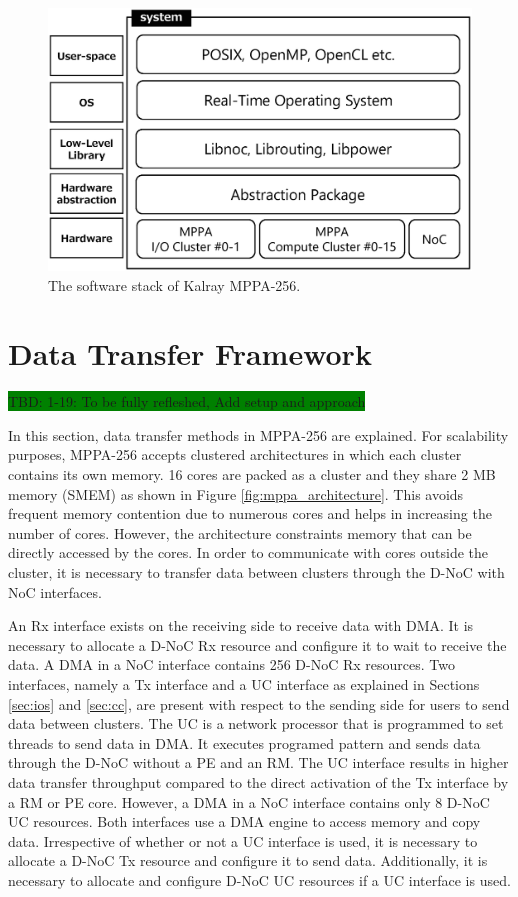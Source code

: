 \documentclass[conference,compsoc]{IEEEtran}
\begin{document}
\begin{figure}[t]
  \centering
  \includegraphics[width=0.8\linewidth]{../figure/softwarestack.eps}
  \caption{\label{fig:software_stack}
    The software stack of Kalray MPPA-256.}
\end{figure}


\section{Data Transfer Framework}
\label{sec:framework}
\colorbox{green}{TBD: 1-19: To be fully refleshed, Add setup and approach}

In this section, data transfer methods in MPPA-256 are explained.
For scalability purposes, MPPA-256 accepts clustered architectures in which each cluster contains its own memory.
16 cores are packed as a cluster and they share 2 MB memory (SMEM) as shown in Figure \ref{fig:mppa_architecture}.
This avoids frequent memory contention due to numerous cores and helps in increasing the number of cores.
However, the architecture constraints memory that can be directly accessed by the cores.
In order to communicate with cores outside the cluster, it is necessary to transfer data between clusters through the D-NoC with NoC interfaces.

An Rx interface exists on the receiving side to receive data with DMA.
It is necessary to allocate a D-NoC Rx resource and configure it to wait to receive the data.
A DMA in a NoC interface contains 256 D-NoC Rx resources.
Two interfaces, namely a Tx interface and a UC interface as explained in Sections \ref{sec:ios} and \ref{sec:cc},
are present with respect to the sending side for users to send data between clusters.
The UC is a network processor that is programmed to set threads to send data in DMA.
It executes programed pattern and sends data through the D-NoC without a PE and an RM.
The UC interface results in higher data transfer throughput compared to the direct activation of the Tx interface by a RM or PE core.
However, a DMA in a NoC interface contains only 8 D-NoC UC resources.
Both interfaces use a DMA engine to access memory and copy data.
Irrespective of whether or not a UC interface is used, it is necessary to allocate a D-NoC Tx resource and configure it to send data.
Additionally, it is necessary to allocate and configure D-NoC UC resources if a UC interface is used.
\end{document}
